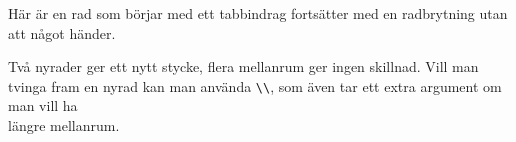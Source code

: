 \documentclass{article}
\begin{document}
	Här är en rad som börjar med ett tabbindrag
	fortsätter med en radbrytning utan att något händer.
	
	Två nyrader ger ett nytt stycke,    flera  mellanrum ger
	ingen skillnad. Vill man\\
	tvinga fram en nyrad kan man använda \verb+\\+, som även tar
	ett extra argument om man vill ha\\[2em] längre mellanrum.
\end{document}
